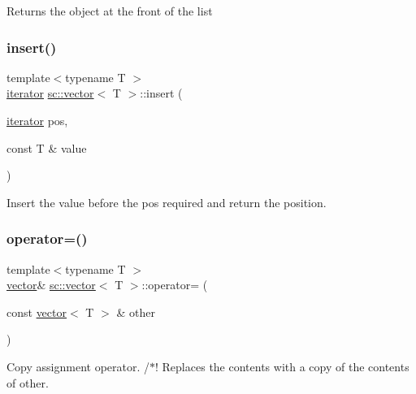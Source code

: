 Returns the object at the front of the list \mbox{\label{classsc_1_1vector_ac55608c5cee9a8311cbe7c4fde998a9f}} 
\subsubsection{\texorpdfstring{insert()}{insert()}}
{\footnotesize\ttfamily template$<$typename T $>$ \\
\hyperlink{classsc_1_1vector_1_1iterator}{iterator} \hyperlink{classsc_1_1vector}{sc\+::vector}$<$ T $>$\+::insert (\begin{DoxyParamCaption}\item[{\hyperlink{classsc_1_1vector_1_1iterator}{iterator}}]{pos,  }\item[{const T \&}]{value }\end{DoxyParamCaption})\hspace{0.3cm}{\ttfamily [inline]}}



Insert the value before the pos required and return the position. 

\mbox{\label{classsc_1_1vector_ac645bc2fa1244d211c9ceecb68d4d539}} 
\subsubsection{\texorpdfstring{operator=()}{operator=()}\hspace{0.1cm}{\footnotesize\ttfamily [1/2]}}
{\footnotesize\ttfamily template$<$typename T $>$ \\
\hyperlink{classsc_1_1vector}{vector}\& \hyperlink{classsc_1_1vector}{sc\+::vector}$<$ T $>$\+::operator= (\begin{DoxyParamCaption}\item[{const \hyperlink{classsc_1_1vector}{vector}$<$ T $>$ \&}]{other }\end{DoxyParamCaption})\hspace{0.3cm}{\ttfamily [inline]}}

Copy assignment operator. /$\ast$! Replaces the contents with a copy of the contents of other. \mbox{\label{classsc_1_1vector_a757984cf36675541db735350d227d609}} 
